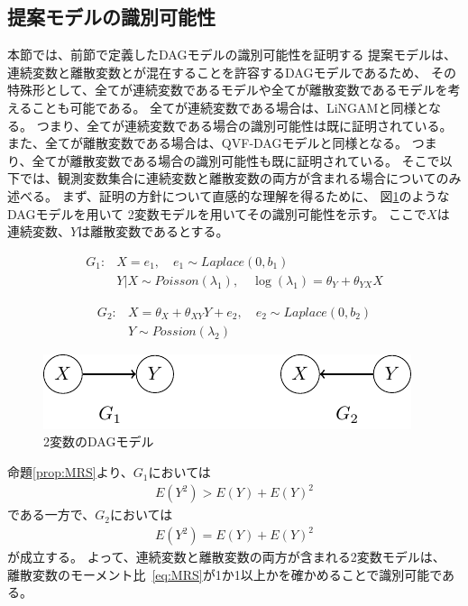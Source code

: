 
\subsection{提案モデルの識別可能性}

本節では、前節で定義したDAGモデルの識別可能性を証明する
提案モデルは、連続変数と離散変数とが混在することを許容するDAGモデルであるため、
その特殊形として、全てが連続変数であるモデルや全てが離散変数であるモデルを考えることも可能である。
全てが連続変数である場合は、LiNGAM\cite{Shimizu2006-yu}と同様となる。
つまり、全てが連続変数である場合の識別可能性は既に証明されている\cite{Shimizu2006-yu}。
また、全てが離散変数である場合は、QVF-DAGモデル\cite{Park2017-hw}と同様となる。
つまり、全てが離散変数である場合の識別可能性も既に証明されている\cite{Park2017-hw}。
そこで以下では、観測変数集合に連続変数と離散変数の両方が含まれる場合についてのみ述べる。
まず、証明の方針について直感的な理解を得るために、
図\ref{fig:ex_prop_bivariate}のようなDAGモデルを用いて
2変数モデルを用いてその識別可能性を示す。
ここで$X$は連続変数、$Y$は離散変数であるとする。

\begin{align*}
  G_1 \colon & X = e_1, \quad e_1 \sim \mathit{Laplace}(0, b_1) \\
             & Y|X \sim \mathit{Poisson}(\lambda_1), \quad \log(\lambda_1) = \theta_Y + \theta_{YX}X
\end{align*}

\begin{align*}
  G_2 \colon & X = \theta_X + \theta_{XY}Y + e_2, \quad e_2 \sim \mathit{Laplace}(0, b_2) \\
             & Y \sim \mathit{Possion}(\lambda_2)
\end{align*}

\begin{figure}[ht]
  \centering
  \includegraphics{./picture/prop_bivariate.pdf}
  \caption{2変数のDAGモデル}
  \label{fig:ex_prop_bivariate}
\end{figure}

命題\ref{prop:MRS}より、$G_1$においては
\begin{align*}
  E(Y^2) > E(Y) + E(Y)^2
\end{align*}
である一方で、$G_2$においては
\begin{align*}
  E(Y^2) = E(Y) + E(Y)^2
\end{align*}
が成立する。
よって、連続変数と離散変数の両方が含まれる2変数モデルは、
離散変数のモーメント比~\eqref{eq:MRS}が1か1以上かを確かめることで識別可能である。

